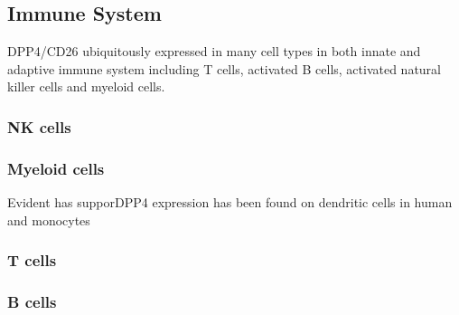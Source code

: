 \subsection{Immune System}
DPP4/CD26 ubiquitously expressed in many cell types in both innate and adaptive immune system including T cells, activated B cells, activated natural killer cells and myeloid cells.~\cite{Abbott1994,Shingu2003,Hong1989,Gutschmidt1981,Dikov2004,Bühling1995,Tanaka1992,Gorrell1991}  

\subsubsection{NK cells}

\subsubsection{Myeloid cells}
Evident has supporDPP4 expression has been found on dendritic cells in human~\cite{Zhong2013,Gliddon2002,Epardaud2004} and monocytes

\subsubsection{T cells}
\subsubsection{B cells}
